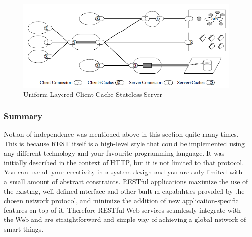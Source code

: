 \begin{center}
 \begin{figure}[h]
	\includegraphics[width=\textwidth]{../images/preliminaries/Uniform-Layered-Client-Cache-Stateless-Server.png}
	\caption{Uniform-Layered-Client-Cache-Stateless-Server \cite{Fielding2000} }
	\label{fig:Uniform-Layered-Client-Cache-Stateless-Server}
 \end{figure}
\end{center}

\subsubsection{Summary}
Notion of independence was mentioned above in this section quite many times.
This is because REST itself is a high-level style that could be implemented
using any different technology and your favourite programming language. It was initially described in the context
of HTTP, but it is not limited to that protocol. 
You can use all your creativity in a system design and you are only limited with a small amount of abstract constraints. 
 RESTful applications maximize the use of the existing, well-defined interface
and other built-in capabilities provided by the chosen network protocol,
and minimize the addition of new application-specific features on top of
it\cite{rest_brief_intro}. Therefore RESTful Web services seamlessly integrate with the
Web and are straightforward and simple way of achieving a global network of
smart things.

